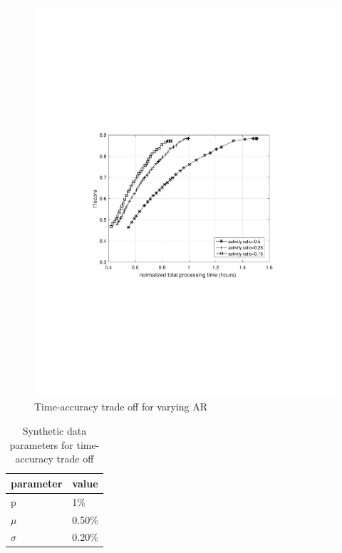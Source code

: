 \begin{figure}
    \centering
    \includegraphics[width=\linewidth,trim={100 240 100 250},clip]{images/time-acc-tradeoff-ar-mog}
    \caption{Time-accuracy trade off for varying AR}
    \label{fig:time-acc-tradeoff-ar-mog}
\end{figure}

\begin{table}
\centering
\caption{Synthetic data parameters for time-accuracy trade off} \vspace{5pt}
\label{table:fig1_data_params}
\begin{tabular}{|l|l|}
\hline
parameter             & value  \\ \hline \hline
p                     & 1\%    \\ 
$\mu$    & 0.50\% \\ 
$\sigma$ & 0.20\% \\ \hline
\end{tabular}
\end{table}

